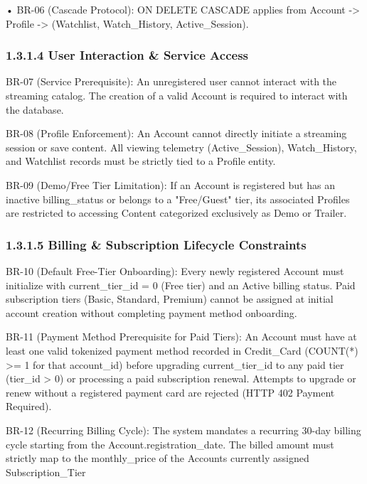 • BR-06 (Cascade Protocol): ON DELETE CASCADE applies from Account -\textgreater{} Profile -\textgreater{} (Watchlist, Watch\_\allowbreak{}History, Active\_\allowbreak{}Session).

\subsubsection*{1.3.1.4 User Interaction \& Service Access}

BR-07 (Service Prerequisite): An unregistered user cannot interact with the streaming catalog. The creation of a valid Account is required to interact with the database.

BR-08 (Profile Enforcement): An Account cannot directly initiate a streaming session or save content. All viewing telemetry (Active\_\allowbreak{}Session), Watch\_\allowbreak{}History, and Watchlist records must be strictly tied to a Profile entity.

BR-09 (Demo/Free Tier Limitation): If an Account is registered but has an inactive billing\_\allowbreak{}status or belongs to a "Free/Guest" tier, its associated Profiles are restricted to accessing Content categorized exclusively as \textquotesingle Demo\textquotesingle{} or \textquotesingle Trailer\textquotesingle.

\subsubsection*{1.3.1.5 Billing \& Subscription Lifecycle Constraints}

BR-10 (Default Free-Tier Onboarding): Every newly registered Account must initialize with current\_\allowbreak{}tier\_\allowbreak{}id = 0 (Free tier) and an \textquotesingle Active\textquotesingle{} billing status. Paid subscription tiers (Basic, Standard, Premium) cannot be assigned at initial account creation without completing payment method onboarding.

BR-11 (Payment Method Prerequisite for Paid Tiers): An Account must have at least one valid tokenized payment method recorded in Credit\_\allowbreak{}Card (COUNT(*) \textgreater= 1 for that account\_\allowbreak{}id) before upgrading current\_\allowbreak{}tier\_\allowbreak{}id to any paid tier (tier\_\allowbreak{}id \textgreater{} 0) or processing a paid subscription renewal. Attempts to upgrade or renew without a registered payment card are rejected (HTTP 402 Payment Required).

BR-12 (Recurring Billing Cycle): The system mandates a recurring 30-day billing cycle starting from the Account.registration\_\allowbreak{}date. The billed amount must strictly map to the monthly\_\allowbreak{}price of the Account\textquotesingle s currently assigned Subscription\_\allowbreak{}Tier

